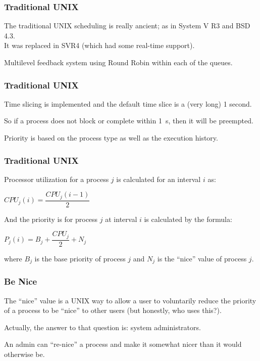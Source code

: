 \begin{frame}
\frametitle{Traditional UNIX}

The traditional UNIX scheduling is really ancient; as in System V R3 and BSD 4.3.\\
\quad It was replaced in SVR4 (which had some real-time support).

Multilevel feedback system using Round Robin within each of the queues. 

\end{frame}

\begin{frame}
\frametitle{Traditional UNIX}

Time slicing is implemented and the default time slice is a (very long) 1 second. 

So if a process does not block or complete within 1~s, then it will be preempted. 

Priority is based on the process type as well as the execution history.

\end{frame}

\begin{frame}
\frametitle{Traditional UNIX}

Processor utilization for a process $j$ is calculated for an interval $i$ as:

\begin{center}
$CPU_{j}(i) = \dfrac{CPU_{j}(i - 1)}{2}$
\end{center}

And the priority is for process $j$ at interval $i$ is calculated by the formula:

\begin{center}
$P_{j}(i) = B_{j} + \dfrac{CPU_{j}}{2} + N_{j}$
\end{center}

where $B_{j}$ is the base priority of process $j$ and $N_{j}$ is the ``nice'' value of process $j$.


\end{frame}

\begin{frame}
\frametitle{Be Nice}

The ``nice'' value is a UNIX way to allow a user to voluntarily reduce the priority of a process to be ``nice'' to other users (but honestly, who uses this?).

Actually, the answer to that question is: system administrators. 

An admin can ``re-nice'' a process and make it somewhat nicer than it would otherwise be.


\end{frame}

